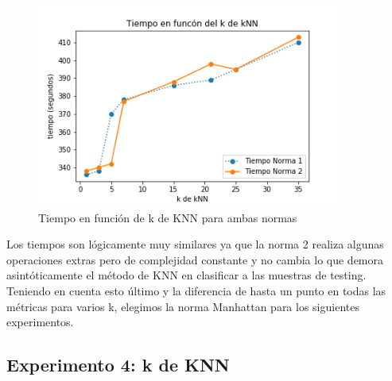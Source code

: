 \begin{figure}[H]
     \begin{center}
     \includegraphics[width=100mm]{img/tiempo_normas.png} 
    \end{center}
\caption{Tiempo en función de k de KNN para ambas normas} \label{fig:exp3-tiempo-normas}
\end{figure}

Los tiempos son lógicamente muy similares ya que la norma 2 realiza algunas operaciones extras pero de complejidad constante y no cambia lo que demora asintóticamente el método de KNN en clasificar a las muestras de testing. \\

Teniendo en cuenta esto último y la diferencia de hasta un punto en todas las métricas para varios k, elegimos la norma Manhattan para los siguientes experimentos.

\newpage
\subsection{Experimento 4: k de KNN}

